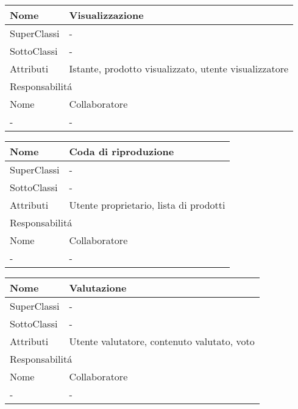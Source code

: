 \begin{center}
    \begin{tabular}{ |p{3cm}|p{3cm}|p{3cm}|p{3cm}| }
        \hline
        Nome & \multicolumn{3}{|p{9cm}|}{Visualizzazione} \\\hline
        SuperClassi & \multicolumn{3}{|p{9cm}|}{-} \\\hline
        SottoClassi & \multicolumn{3}{|p{9cm}|}{-} \\\hline
        Attributi & \multicolumn{3}{|p{9cm}|}{Istante, prodotto visualizzato, utente visualizzatore} \\\hline
        \multicolumn{4}{|p{12cm}|}{Responsabilit\'a} \\\hline
        \multicolumn{2}{|p{6cm}|}{Nome} & \multicolumn{2}{|p{6cm}|}{Collaboratore} \\\hline
        \multicolumn{2}{|p{6cm}|}{-} & \multicolumn{2}{|p{6cm}|}{-} \\\hline
    \end{tabular}
\end{center}

\begin{center}
    \begin{tabular}{ |p{3cm}|p{3cm}|p{3cm}|p{3cm}| }
        \hline
        Nome & \multicolumn{3}{|p{9cm}|}{Coda di riproduzione} \\\hline
        SuperClassi & \multicolumn{3}{|p{9cm}|}{-} \\\hline
        SottoClassi & \multicolumn{3}{|p{9cm}|}{-} \\\hline
        Attributi & \multicolumn{3}{|p{9cm}|}{Utente proprietario, lista di prodotti} \\\hline
        \multicolumn{4}{|p{12cm}|}{Responsabilit\'a} \\\hline
        \multicolumn{2}{|p{6cm}|}{Nome} & \multicolumn{2}{|p{6cm}|}{Collaboratore} \\\hline
        \multicolumn{2}{|p{6cm}|}{-} & \multicolumn{2}{|p{6cm}|}{-} \\\hline
    \end{tabular}
\end{center}

\begin{center}
    \begin{tabular}{ |p{3cm}|p{3cm}|p{3cm}|p{3cm}| }
        \hline
        Nome & \multicolumn{3}{|p{9cm}|}{Valutazione} \\\hline
        SuperClassi & \multicolumn{3}{|p{9cm}|}{-} \\\hline
        SottoClassi & \multicolumn{3}{|p{9cm}|}{-} \\\hline
        Attributi & \multicolumn{3}{|p{9cm}|}{Utente valutatore, contenuto valutato, voto} \\\hline
        \multicolumn{4}{|p{12cm}|}{Responsabilit\'a} \\\hline
        \multicolumn{2}{|p{6cm}|}{Nome} & \multicolumn{2}{|p{6cm}|}{Collaboratore} \\\hline
        \multicolumn{2}{|p{6cm}|}{-} & \multicolumn{2}{|p{6cm}|}{-} \\\hline
    \end{tabular}
\end{center}

